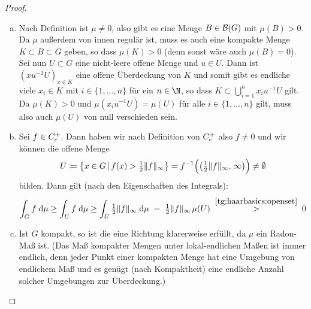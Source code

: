 \begin{proof}\hfill
    \begin{enumerate}[(a)]
        \item
            Nach Definition ist $\mu\neq0$, also gibt es eine Menge
            $B\in\mathcal{B}(G)$ mit $\mu(B)>0$. Da $\mu$ außerdem von innen
            regulär ist, muss es auch eine kompakte Menge $K\subset B\subset G$
            geben, so dass $\mu(K)>0$ (denn sonst wäre auch $\mu(B)=0$). Sei nun
            $U\subset G$ eine nicht-leere offene Menge und $u\in U$. Dann ist
            $(xu^{-1}U)_{x\in K}$ eine offene Überdeckung von $K$ und somit gibt
            es endliche viele $x_i\in K$ mit $i\in\{1,\ldots,n\}$ für ein
            $n\in\N$, so dass $K\subset \bigcup_{i=1}^n x_iu^{-1}U$ gilt. Da
            $\mu(K)>0$ und $\mu(x_iu^{-1}U) = \mu(U)$ für alle
            $i\in\{1,\ldots,n\}$ gilt, muss also auch $\mu(U)$ von null
            verschieden sein.
            
        \item
            Sei $f\in C_c^+$. Dann haben wir nach Definition von
            $C_c^+$ also $f\neq0$ und wir können die offene Menge
            \[ U\defeq \bigl\{ x\in G \Mid f(x) > \thalf\supnorm{f} \bigr\} 
                = f^{-1}\Bigl( 
                        \bigl(\thalf\supnorm{f}, \mkern2mu\infty\bigr) 
                    \Bigr) \neq \emptyset
            \]
            bilden. Dann gilt (nach den Eigenschaften des Integrals):
            \[ \int_G f \;\mathrm{d} \mu \geq \int_U f \;\mathrm{d} \mu \geq \int_U
                \tfrac{1}{2} \lVert f\rVert_\infty \;\mathrm{d} \mu \;=\; \tfrac{1}{2}\lVert f\rVert_\infty \, \mu(U) 
                \;\overset{\ref{tg:haarbasics:openset}}{>}\; 0
            \]
            
        \item
            Ist $G$ kompakt, so ist die eine Richtung klarerweise erfüllt, da $\mu$
            ein Radon-Maß ist. (Das Maß kompakter Mengen unter lokal-endlichen
            Maßen ist immer endlich, denn jeder Punkt einer kompakten Menge hat
            eine Umgebung von endlichem Maß und es genügt (nach Kompaktheit)
            eine endliche Anzahl solcher Umgebungen zur Überdeckung.)
            

\end{enumerate}
\end{proof}
